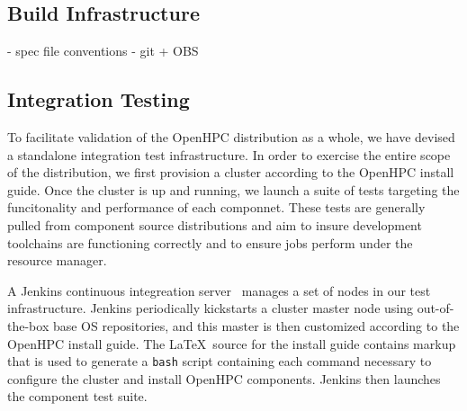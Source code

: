 \documentclass{sig-alternate-05-2015}
\begin{document}




\subsection{Build Infrastructure}

 - spec file conventions
 - git + OBS
 
\subsection{Integration Testing}
To facilitate validation of the OpenHPC distribution as a whole, we have 
devised a standalone integration test infrastructure. In order to exercise the
entire scope of the distribution, we first provision a cluster according to the
OpenHPC install guide. Once the cluster is up and running, we launch a suite of 
tests targeting the funcitonality and performance of each componnet. These tests 
are generally pulled from component source distributions and aim to insure 
development toolchains are functioning correctly and to ensure jobs perform 
under the resource manager.

A Jenkins continuous integreation server~\cite{jenkins_url} manages a set of 
nodes in our test infrastructure. Jenkins periodically kickstarts a cluster 
master node using out-of-the-box base OS repositories, and this master is then 
customized according to the OpenHPC install guide. The \LaTeX\ source for the 
install guide contains markup that is used to generate a \texttt{{bash}} script 
containing each command necessary to configure the cluster and install OpenHPC
components. Jenkins then launches the component test suite.
\end{document}
